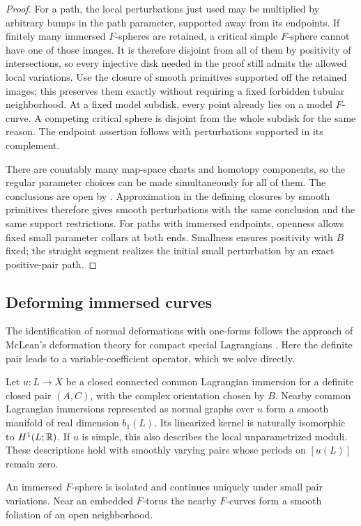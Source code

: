 \begin{proof}
For a path, the local perturbations just used may be multiplied by
arbitrary bumps in the path parameter, supported away from its
endpoints.  If finitely many immersed $F$-spheres are retained, a
critical simple $F$-sphere cannot have one of those images.  It is
therefore disjoint from all of them by positivity of intersections,
so every injective disk needed in the proof still admits the allowed
local variations.  Use the closure of smooth primitives supported
off the retained images; this preserves them exactly without requiring
a fixed forbidden tubular neighborhood.  At a fixed model subdisk,
every point already lies on a model $F$-curve.  A competing critical
sphere is disjoint from the whole subdisk for the same reason.  The
endpoint assertion follows with perturbations supported in its
complement.

There are countably many map-space charts and homotopy components,
so the regular parameter choices can be made simultaneously for all
of them.  The conclusions are open by .
Approximation in the defining closures by smooth primitives therefore
gives smooth perturbations with the same conclusion and the same
support restrictions.  For paths with immersed endpoints, openness
allows fixed small parameter collars at both ends.  Smallness ensures
positivity with $B$ fixed; the straight segment realizes the initial
small perturbation by an exact positive-pair path.
\end{proof}

\subsection{Deforming immersed curves}

The identification of normal deformations with one-forms follows the
approach of McLean's deformation theory for compact special Lagrangians
\cite[Theorem~3.6 and Corollary~3.9]{McLean1998}.
Here the definite pair leads to a variable-coefficient operator, which
we solve directly.

\begin{lemma}\label{lem:pencil-normal}
Let $u:L\to X$ be a closed connected common Lagrangian immersion for a definite
closed pair $(A,C)$, with the complex orientation chosen by $B$.
Nearby common Lagrangian immersions represented as normal graphs over
$u$ form a smooth manifold of real dimension $b_1(L)$.
Its linearized kernel is naturally isomorphic to $H^1(L;\mathbb R)$.
If $u$ is simple, this also describes the local unparametrized moduli.
These descriptions hold with smoothly varying pairs whose periods on
$[u(L)]$ remain zero.

An immersed $F$-sphere is isolated and continues uniquely under small
pair variations.  Near an embedded $F$-torus the nearby $F$-curves
form a smooth foliation of an open neighborhood.
\end{lemma}

